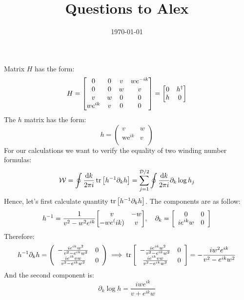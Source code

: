 \documentclass[12pt,a4paper]{article}
\title{Questions to Alex}
\date{\today}
\newcommand{\pd}[1]{\partial_{#1}}
\begin{document}
    \maketitle

    Matrix $H$ has the form:
    \[
        H = \mqty[0 & 0 & v & w e^{-ik} \\ 0 & 0 & w & v \\ v & w & 0 & 0 \\ w e^{ik} & v &0 &0] = \mqty[0 & h^\dagger \\ h & 0]
    \]
    The $h$ matrix has the form:
    \[
        h = \left(
            \begin{array}{cc}
             v & w \\
             \text{we}^{i k} & v \\
            \end{array}
            \right)    
    \]
    For our calculations we want to verify the equality of two winding number formulas:
    \[
            \mathcal{W} = \oint \frac{\dd{k}}{2 \pi i} \tr \qty[h^{-1} \pd{k} h] = \sum_{j=1}^{\mathcal{D}/2} \oint \frac{\dd{k}}{2 \pi i} \pd{k} \log{h_j}
    \]
    Hence, let's first calculate quantity $\tr \qty[h^{-1} \pd{k} h]$. The components are as follow:
    \[
            h^{-1} = \frac{1}{v^2 - w^2 e^{ik}} \mqty[v & -w \\ -w e^(i k) & v] \qc \pd{k} = \left[
                \begin{array}{cc}
                 0 & 0 \\
                 i e^{i k} w & 0 \\
                \end{array}
                \right]
    \]
    Therefore:
    \[
                h^{-1} \pd{k} h = \left(
                    \begin{array}{cc}
                     -\frac{i e^{i k} w^2}{v^2-e^{i k} w^2} & 0 \\
                     \frac{i e^{i k} v w}{v^2-e^{i k} w^2} & 0 \\
                    \end{array}
                    \right) \implies \tr \qty[
                        \begin{array}{cc}
                         -\frac{i e^{i k} w^2}{v^2-e^{i k} w^2} & 0 \\
                         \frac{i e^{i k} v w}{v^2-e^{i k} w^2} & 0 \\
                        \end{array}
                        ] = -\frac{i w^2 e^{i k} }{v^2-e^{i k} w^2}
    \]
    And the second component is:
    \[
        \pd{k}\log{h} = \frac{i w e^{i k}}{v+e^{i k} w}
    \]
\end{document}
